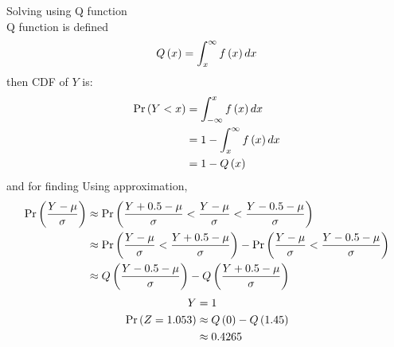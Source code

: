 \documentclass[]{article}
\begin{document}
Solving using Q function\\
Q function is defined
\begin{align}
	Q\left(x\right)=\int_x^{\infty}f\left(x\right)dx
\end{align}
then CDF of $Y$ is:
\begin{align}
	\Pr\left(Y<x\right)&=\int_{-\infty}^x f\left(x\right) dx\\
	&=1-\int_x^{\infty}f\left(x\right)dx\\
	&=1-Q\left(x\right)
\end{align}
and for finding  Using approximation,
\begin{align}
	\Pr\left(\frac{Y-\mu}{\sigma}\right) &\approx \Pr\left(\frac{Y+0.5-\mu}{\sigma} < \frac{Y-\mu}{\sigma} < \frac{Y-0.5-\mu}{\sigma}\right)\\
	&\approx \Pr\left(\frac{Y-\mu}{\sigma}<\frac{Y+0.5-\mu}{\sigma}\right) - \Pr\left(\frac{Y-\mu}{\sigma}<\frac{Y-0.5-\mu}{\sigma}\right)\\
	&\approx Q\left(\frac{Y-0.5-\mu}{\sigma}\right) - Q\left(\frac{Y+0.5-\mu}{\sigma}\right)
\end{align}
\begin{align}
Y &= 1\\
\Pr\left(Z=1.053\right) &\approx Q\left(0\right) - Q\left(1.45\right)\\
	       &\approx 0.4265
\end{align}
\end{document}
